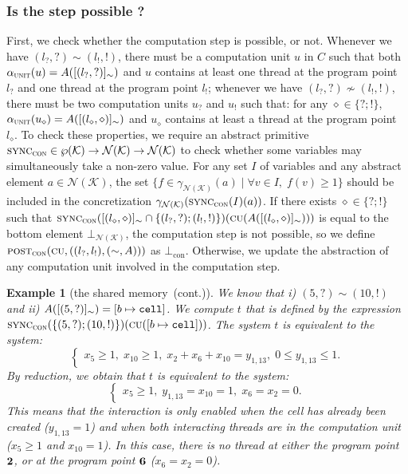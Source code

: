 \documentclass{article}
\newtheorem{example}[thm]{Example}
\newcommand{\rec}{?}
\newcommand{\eme}{!}
\newcommand{\pp}[1]{$\bf{#1}$}
\newcommand{\internal}[1]{\textnormal{\texttt{#1}}}
\newcommand{\ccell}{\internal{cell}}
\newcommand{\memlaba}{1}
\newcommand{\memlabb}{2}
\newcommand{\memlabe}{5}
\newcommand{\memlabf}{6}
\newcommand{\memlabj}{10}
\newcommand{\memlabm}{13}
\newcommand{\lrec}{l_{\rec}}
\newcommand{\leme}{l_{\eme}}
\newcommand{\continued}{(cont.)}
\newcommand{\piunit}{\alpha_\computationunit}
\newcommand{\computationunit}{\textsc{unit}}
\newcommand{\abst}[1]{\textsc{post}_{#1}}
\newcommand{\abot}[1]{\bot_{#1}}
\newcommand{\shareanalysis}{the shared memory}
\newcommand{\tp}{\textsc{cu}}
\newcommand{\var}{\mathcal{K}}
\newcommand{\numkey}{\textsc{con}}
\newcommand{\abstnum}{\mathcal{N}(\var)}
\newcommand{\gammanum}{\gamma_{\abstnum}}
\newcommand{\botnum}{\bot_{\abstnum}}
\newcommand{\syncnume}{\textsc{sync}_{\numkey}}
\newcommand{\Numkey}{\text{con}}
\newcommand{\botNum}{\abot{\Numkey}}
\newcommand{\ccontentanalysis}{\shareanalysis\ \continued}
\begin{document}
\subsubsection{Is the step possible ?}
First, we check whether the computation step is possible, or not. 
Whenever we have $(\lrec,\rec)\sim (\leme,\eme)$, 
there must be a computation unit $u$ in $C$ such that both  $\piunit(u)=A([(\lrec,\rec)]_\sim)$ and $u$ contains at least one thread at the program point $\lrec$ and one thread at the program point $\leme$; 
whenever we have $(\lrec,\rec)\not\sim (\leme,\eme)$,
there must be two computation units $u_{\rec}$ and $u_{\eme}$ such that: for any $\diamond\in\{\rec;\eme\}$, $\piunit(u_{\diamond})=A([(l_{\diamond},\diamond)]_\sim)$ and  $u_{\diamond}$ contains at least a thread at the program point $l_{\diamond}$.
To check these properties, we require an abstract primitive $\syncnume\in\wp(\var)\rightarrow \abstnum \rightarrow \abstnum$ to check whether some variables may simultaneously take a non-zero value.
For any set $I$ of variables and any abstract element $a\in\abstnum$, 
the set $\{f\in\gammanum(a)\;|\;\forall v\in I,\;f(v)\geq 1\}$ should be included in the concretization $\gammanum(\syncnume(I)(a))$.
If there exists $\diamond\in \{\rec;\eme\}$ such that 
$\syncnume([(l_{\diamond},\diamond)]_{\sim}\cap \{(\lrec,\rec);(\leme,\eme)\})(\tp(A([(l_{\diamond},\diamond)]_\sim)))$ is equal to the bottom element $\botnum$, 
the computation step is not possible, so we define $\abst{\numkey}(\tp,((\lrec,\leme),(\sim,A)))$ as $\botNum$.
Otherwise, we  update the abstraction of any computation unit involved in the computation step.




\begin{example}[\ccontentanalysis]
We know that i) $(\memlabe,\rec)\sim (\memlabj,\eme)$ and ii) $A([(\memlabe,\rec)]_\sim)=[b\mapsto \ccell]$.
We compute $t$ that is defined by the expression   $\syncnume(\{(\memlabe,\rec);(\memlabj,\eme)\})(\tp([b\mapsto \ccell]))$.
The system $t$ is equivalent to the system: 
\begin{equation*}
\begin{cases}
x_{\memlabe}\geq 1,\;x_{\memlabj}\geq 1,\;
x_{\memlabb} + x_{\memlabf} + x_{\memlabj} = y_{\memlaba,\memlabm},\;
0 \leq y_{\memlaba,\memlabm} \leq 1.
\end{cases}
\end{equation*}
 By reduction, we obtain that 
$t$ is equivalent to the system:
\begin{equation*}
\begin{cases}
x_{\memlabe}\geq 1,\;
y_{\memlaba,\memlabm}=x_{\memlabj}=1,\;
x_{\memlabf}=x_{\memlabb}=0.
\end{cases}
\end{equation*}  
This means that the interaction is only enabled when the cell has already been created ($y_{\memlaba,\memlabm}=1$) and when both interacting threads are in the computation unit ($x_{\memlabe}\geq 1$ and $x_{\memlabj}=1$). 
In this case, there is no thread at either the program point \pp{\memlabb}, or at the program point \pp{\memlabf} ($x_{\memlabf}=x_{\memlabb}=0$). 
\end{example}
\end{document}
